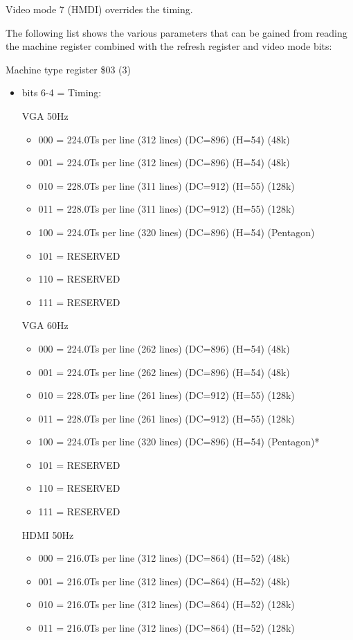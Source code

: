 Video mode 7 (HMDI) overrides the timing.

The following list shows the various parameters that can be gained
from reading the machine register combined with the refresh register
and video mode bits:

Machine type register \$03 (3)
\begin{itemize}
\item[] bits 6-4 = Timing:

  VGA 50Hz
  \begin{itemize}
  \item[] 000 = 224.0Ts per line (312 lines) (DC=896) (H=54) (48k)
  \item[] 001 = 224.0Ts per line (312 lines) (DC=896) (H=54) (48k)
  \item[] 010 = 228.0Ts per line (311 lines) (DC=912) (H=55) (128k)
  \item[] 011 = 228.0Ts per line (311 lines) (DC=912) (H=55) (128k)
  \item[] 100 = 224.0Ts per line (320 lines) (DC=896) (H=54) (Pentagon)
  \item[] 101 = RESERVED
  \item[] 110 = RESERVED
  \item[] 111 = RESERVED
  \end{itemize}
    VGA 60Hz
  \begin{itemize}
  \item[] 000 = 224.0Ts per line (262 lines) (DC=896) (H=54) (48k)
  \item[] 001 = 224.0Ts per line (262 lines) (DC=896) (H=54) (48k)
  \item[] 010 = 228.0Ts per line (261 lines) (DC=912) (H=55) (128k)
  \item[] 011 = 228.0Ts per line (261 lines) (DC=912) (H=55) (128k)
  \item[] 100 = 224.0Ts per line (320 lines) (DC=896) (H=54) (Pentagon)*
  \item[] 101 = RESERVED
  \item[] 110 = RESERVED
  \item[] 111 = RESERVED
  \end{itemize}
    HDMI 50Hz
  \begin{itemize}
  \item[] 000 = 216.0Ts per line (312 lines) (DC=864) (H=52) (48k)
  \item[] 001 = 216.0Ts per line (312 lines) (DC=864) (H=52) (48k)
  \item[] 010 = 216.0Ts per line (312 lines) (DC=864) (H=52) (128k)
  \item[] 011 = 216.0Ts per line (312 lines) (DC=864) (H=52) (128k)

\end{itemize}
\end{itemize}
